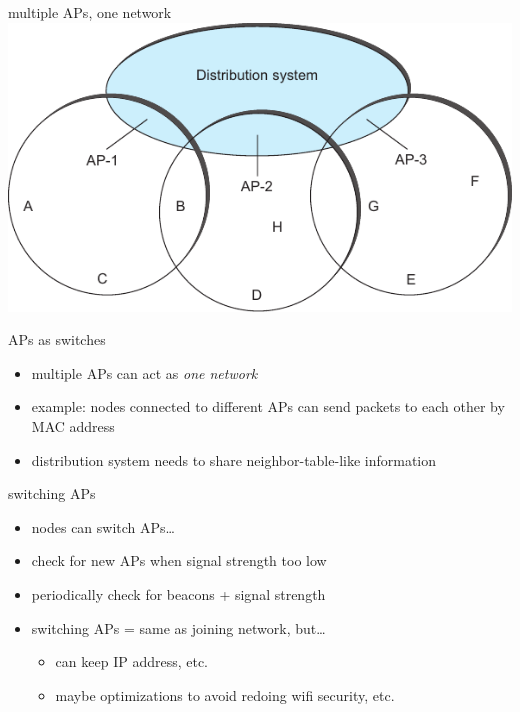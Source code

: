 \usetikzlibrary{calc}
\begin{frame}{multiple APs, one network}
\includegraphics[width=\textwidth]{../multiaccess/cnsp-fig48}
\end{frame}

\begin{frame}{APs as switches}
    \begin{itemize}
    \item multiple APs can act as \textit{one network}
    \item example: nodes connected to different APs can send packets to each other by MAC address
    \vspace{.5cm}
    \item distribution system needs to share neighbor-table-like information
    \end{itemize}
\end{frame}

\begin{frame}{switching APs}
    \begin{itemize}
    \item nodes can switch APs\ldots
    \vspace{.5cm}
    \item check for new APs when signal strength too low
    \item periodically check for beacons + signal strength
    \vspace{.5cm}
    \item switching APs = same as joining network, but\ldots
        \begin{itemize}
        \item can keep IP address, etc.
        \item maybe optimizations to avoid redoing wifi security, etc.
        \end{itemize}
    \end{itemize}
\end{frame}

